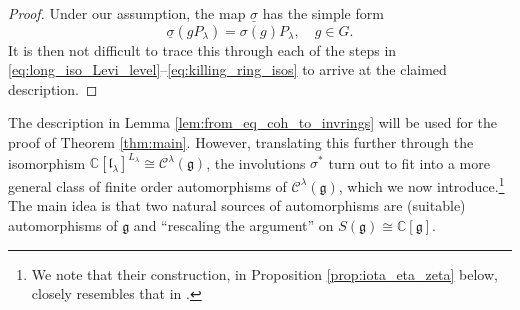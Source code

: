 \documentclass{amsart}
\newcommand{\C}{\mathbb{C}}
\newcommand{\Kir}{\mathcal{C}}
\newcommand{\g}{\mathfrak{g}}
\newcommand{\el}{\mathfrak{l}}
\theoremstyle{definition}
\theoremstyle{plain}
\theoremstyle{remark}
\begin{document}
\begin{proof}
    Under our assumption, the map $\underline{\sigma}$ has the simple form
    $$
        \underline{\sigma}(gP_\lambda) = \sigma(g)P_\lambda,
        \quad
        g\in G.
    $$
    It is then not difficult to trace this through each of the steps in \eqref{eq:long_iso_Levi_level}--\eqref{eq:killing_ring_isos} to arrive at the claimed description.
\end{proof}

The description in Lemma \ref{lem:from_eq_coh_to_invrings} will be used for the proof of Theorem \ref{thm:main}. However, translating this further through the isomorphism $\C[\el_\lambda]^{L_\lambda} \cong \Kir^\lambda(\g) $, the involutions $\sigma^*$ turn out to fit into a more general class of finite order automorphisms of $\Kir^\lambda(\g)$, which we now introduce.\footnote{We note that their construction, in Proposition \ref{prop:iota_eta_zeta} below, closely resembles that in \cite[Thm.\,6.3]{GPRa2019_involutions}.} The main idea is that two natural sources of automorphisms are (suitable) automorphisms of $\g$ and ``rescaling the argument'' on $S(\g) \cong \C[\g]$. 
\end{document}
